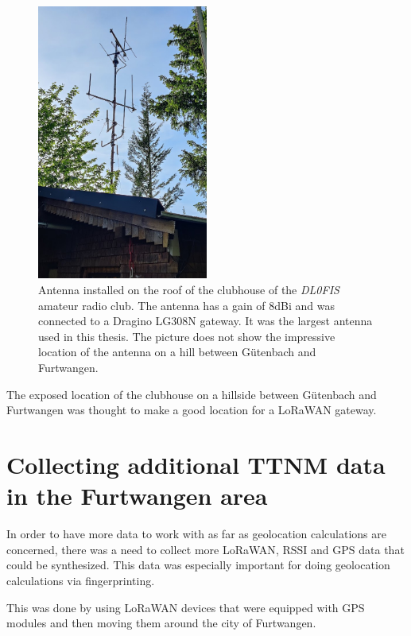 \begin{figure}[htbp]
    \centering
    \includegraphics[width=0.5\textwidth]{pictures/hardware/gateway-deployment/gateway_dl0fis_clubhouse.jpg}
    \caption{
        Antenna installed on the roof of the clubhouse of the \emph{DL0FIS} amateur radio club.
        The antenna has a gain of 8dBi and was connected to a Dragino LG308N gateway.
        It was the largest antenna used in this thesis.
        The picture does not show the impressive location of the antenna on a hill between Gütenbach and Furtwangen.
    }\label{pic:antenna-dl0fis-clubhouse}
\end{figure}

The exposed location of the clubhouse on a hillside between Gütenbach and Furtwangen was thought to make a good location for a \ac{LoRaWAN} gateway.

\section{Collecting additional \acf{TTNM} data in the Furtwangen area}\label{sec:collecting-additional-ttnm-data}

In order to have more data to work with as far as geolocation calculations are concerned, there was a need to collect more \ac{LoRaWAN}, \ac{RSSI} and \ac{GPS} data that could be synthesized.
This data was especially important for doing geolocation calculations via fingerprinting.

This was done by using \ac{LoRaWAN} devices that were equipped with \ac{GPS} modules and then moving them around the city of Furtwangen.


